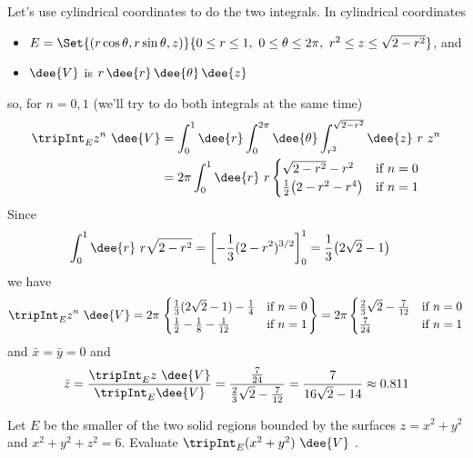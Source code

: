 \begin{solution}
Let's use cylindrical coordinates to do the two integrals.
In cylindrical coordinates 
\begin{itemize}
\item
$E = \Set{(r\cos\theta,r\sin\theta,z)}{ 0\le r\le 1,\ 0\le\theta\le 2\pi,\ 
                                     r^2\le z\le \sqrt{2-r^2}}$, and
\item
$\dee{V}$ is $r\,\dee{r}\,\dee{\theta}\,\dee{z}$
\end{itemize}
so, for $n=0,1$ (we'll try to do both integrals at the same time)
\begin{align*}
\tripInt_E z^n\ \dee{V}
&=\int_0^1\dee{r} \int_0^{2\pi}\dee{\theta}
   \int_{r^2}^{\sqrt{2-r^2}} \dee{z}\ r\ z^n \\
&=2\pi\int_0^1\dee{r}  \ r\begin{cases}
                  \sqrt{2-r^2}-r^2 & \text{if }n=0 \\
                  \frac{1}{2}\big(2-r^2-r^4\big) & \text{if }n=1
                  \end{cases}
\end{align*}
Since
\begin{align*}
\int_0^1 \dee{r}\ r\sqrt{2-r^2}
&=\left[-\frac{1}{3}(2-r^2)^{3/2}\right]_0^1
=\frac{1}{3}\big(2\sqrt{2}-1\big)
\end{align*}
we have
\begin{align*}
\tripInt_E z^n\ \dee{V}
=2\pi\left.\begin{cases}
\frac{1}{3}(2\sqrt{2}-1)-\frac{1}{4} &\text{if }n=0 \\
\frac{1}{2}-\frac{1}{8}-\frac{1}{12} &\text{if }n=1 
\end{cases}\right\}
=2\pi\begin{cases}
\frac{2}{3}\sqrt{2}-\frac{7}{12} &\text{if }n=0 \\
\frac{7}{24} &\text{if }n=1 
\end{cases}
\end{align*}
and $\bar x=\bar y=0$ and
\begin{align*}
\bar z =\frac{\tripInt_E z\ \dee{V}}{\tripInt_E\dee{V}}
  =\frac{\frac{7}{24}}{\frac{2}{3}\sqrt{2}-\frac{7}{12}}
  =\frac{7}{16\sqrt{2}-14}
  \approx 0.811
\end{align*}
\end{solution}

\begin{question}[M200 2012A] %
Let $E$ be the smaller of the two solid regions bounded by the surfaces 
$z = x^2 + y^2$ and $x^2 + y^2 + z^2 = 6$. Evaluate
$\tripInt_E (x^2+y^2)\ \dee{V}$ .
\end{question}

